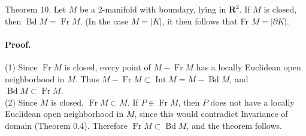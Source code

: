 Theorem 10. Let $M$ be a 2-manifold with boundary, lying in $\mathbf{R}^{2}$. If $M$ is closed, then $\operatorname{Bd} M=\operatorname{Fr} M$. (In the case $M=|K|$, it then follows that Fr $M=|\partial K|$.

\paragraph{Proof.}
(1) Since $\operatorname{Fr} M$ is closed, every point of $M-\operatorname{Fr} M$ has a locally Euclidean open neighborhood in $M$. Thus $M-\operatorname{Fr} M \subset \operatorname{Int} M=M- \operatorname{Bd} M$, and $\operatorname{Bd} M \subset \operatorname{Fr} M$.\\
(2) Since $M$ is closed, $\operatorname{Fr} M \subset M$. If $P \in \operatorname{Fr} M$, then $P$ does not have a locally Euclidean open neighborhood in $M$, since this would contradict Invariance of domain (Theorem 0.4). Therefore $\operatorname{Fr} M \subset \operatorname{Bd} M$, and the theorem follows.
